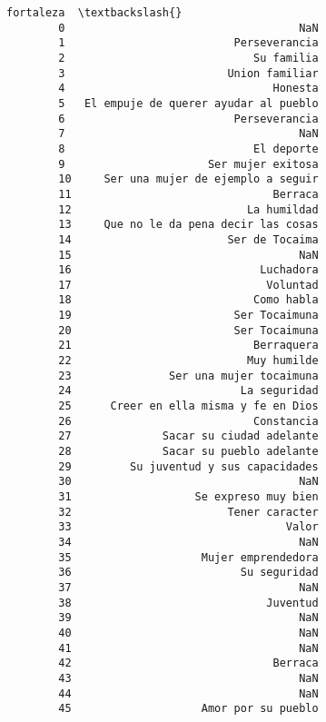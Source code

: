 \documentclass[11pt]{article}
\begin{document}
\begin{Verbatim}[commandchars=\\\{\}]
                                       fortaleza  \textbackslash{}
        0                                    NaN   
        1                          Perseverancia   
        2                             Su familia   
        3                         Union familiar   
        4                                Honesta   
        5   El empuje de querer ayudar al pueblo   
        6                          Perseverancia   
        7                                    NaN   
        8                             El deporte   
        9                      Ser mujer exitosa   
        10     Ser una mujer de ejemplo a seguir   
        11                               Berraca   
        12                           La humildad   
        13     Que no le da pena decir las cosas   
        14                        Ser de Tocaima   
        15                                   NaN   
        16                             Luchadora   
        17                              Voluntad   
        18                            Como habla   
        19                         Ser Tocaimuna   
        20                         Ser Tocaimuna   
        21                            Berraquera   
        22                           Muy humilde   
        23               Ser una mujer tocaimuna   
        24                          La seguridad   
        25      Creer en ella misma y fe en Dios   
        26                            Constancia   
        27              Sacar su ciudad adelante   
        28              Sacar su pueblo adelante   
        29         Su juventud y sus capacidades   
        30                                   NaN   
        31                   Se expreso muy bien   
        32                        Tener caracter   
        33                                 Valor   
        34                                   NaN   
        35                    Mujer emprendedora   
        36                          Su seguridad   
        37                                   NaN   
        38                              Juventud   
        39                                   NaN   
        40                                   NaN   
        41                                   NaN   
        42                               Berraca   
        43                                   NaN   
        44                                   NaN   
        45                    Amor por su pueblo   
        

\end{Verbatim}
\end{document}
